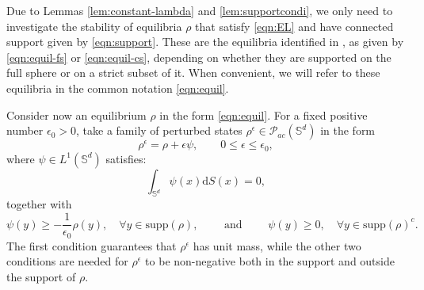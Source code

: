 \documentclass[11pt]{amsart}
\newcommand{\bbs}{\mathbb S}
\newcommand{\calP}{\mathcal{P}}
\newcommand{\dx}{\mathrm{d}S (x)}
\newcommand{\supp}{\mathrm{supp}(\rho)}
\newcommand{\dm}{d} %
\begin{document}
Due to Lemmas \ref{lem:constant-lambda} and \ref{lem:supportcondi}, we only need to investigate the stability of equilibria $\rho$ that satisfy \eqref{eqn:EL} and have connected support given by \eqref{eqn:support}. These are the equilibria identified in \cite{FePaVa2025}, as given by \eqref{eqn:equil-fs} or \eqref{eqn:equil-cs}, depending on whether they are supported on the full sphere or on a strict subset of it. When convenient, we will refer to these equilibria in the common notation \eqref{eqn:equil}.

Consider now an equilibrium $\rho$ in the form \eqref{eqn:equil}. For a fixed positive number $\epsilon_0>0$, take a family of perturbed states $\rho^\epsilon \in \calP_{ac} (\bbs^\dm)$ in the form
\begin{equation}
\label{eqn:rhoeps}
\rho^\epsilon=\rho+\epsilon\psi,\qquad  0\leq \epsilon\leq\epsilon_0,
\end{equation}
where $\psi \in L^1(\bbs^\dm)$ satisfies:
\begin{equation}
\label{eqn:psi-L1}
\int_{\bbs^\dm}\psi(x)\dx=0,
\end{equation}
together with
\begin{equation}
\label{eqn:rhoeps-pos}
\psi(y)\geq-\frac{1}{\epsilon_0}\rho(y),\quad \forall 
 y\in\supp, \qquad \text{ and } \qquad \psi(y)\geq0, \quad\forall  y\in\supp^c.
\end{equation}
The first condition guarantees that $\rho^\epsilon$ has unit mass, while the other two conditions are needed for $\rho^\epsilon$ to be non-negative both in the support and outside the support of $\rho$.
\end{document}
